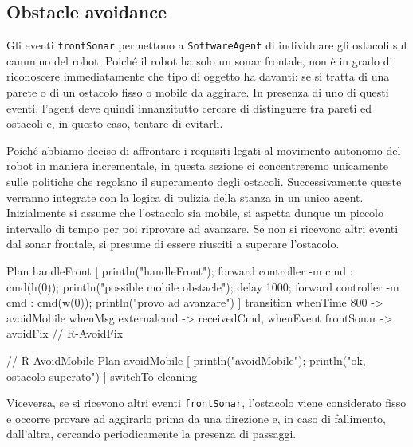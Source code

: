 \documentclass{../llncs}
\newcommand{\codescript}[1]{{\mbox{\small{\texttt{#1}}}}\xspace}
\begin{document}
\subsection{Obstacle avoidance}
Gli eventi \codescript{frontSonar} permettono a \texttt{SoftwareAgent} di individuare gli ostacoli sul cammino del robot. Poiché il robot ha solo un sonar frontale, non è in grado di riconoscere immediatamente che tipo di oggetto ha davanti: se si tratta di una parete o di un ostacolo fisso o mobile da aggirare. In presenza di uno di questi eventi, l'agent deve quindi innanzitutto cercare di distinguere tra pareti ed ostacoli e, in questo caso, tentare di evitarli.

Poiché abbiamo deciso di affrontare i requisiti legati al movimento autonomo del robot in maniera incrementale, in questa sezione ci concentreremo unicamente sulle politiche che regolano il superamento degli ostacoli. Successivamente queste verranno integrate con la logica di pulizia della stanza in un unico agent.\\

Inizialmente si assume che l'ostacolo sia mobile, si aspetta dunque un piccolo intervallo di tempo per poi riprovare ad avanzare. Se non si ricevono altri eventi dal sonar frontale, si presume di essere riusciti a superare l'ostacolo.\\

\begin{qacode}[caption={SoftwareAgent, pt7}]
Plan handleFront [
	println("handleFront");
	forward controller -m cmd : cmd(h(0));
	println("possible mobile obstacle");
	delay 1000;
	forward controller -m cmd : cmd(w(0));
	println("provo ad avanzare")
]
transition
	whenTime 800 -> avoidMobile
	whenMsg externalcmd -> receivedCmd,
	whenEvent frontSonar -> avoidFix // R-AvoidFix
 
 // R-AvoidMobile
 Plan avoidMobile [
	println("avoidMobile");
	println("ok, ostacolo superato")
]
switchTo cleaning
\end{qacode}

Viceversa, se si ricevono altri eventi \codescript{frontSonar}, l'ostacolo viene considerato fisso e occorre provare ad aggirarlo prima da una direzione e, in caso di fallimento, dall'altra, cercando periodicamente la presenza di passaggi.\\
\end{document}

